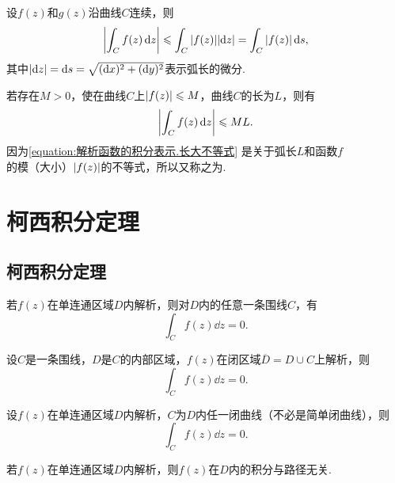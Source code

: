 \begin{theorem}
设\(f(z)\)和\(g(z)\)沿曲线\(C\)连续，则\[
\abs{\int_C f(z) \dd{z}}
\leqslant \int_C{\abs{f(z)}\abs{\dd{z}}}
= \int_C{\abs{f(z)}\dd{s}},
\]其中\(\abs{\dd{z}}=\dd{s}=\sqrt{(\dd{x})^2+(\dd{y})^2}\)表示弧长的微分.
\end{theorem}

\begin{corollary}[积分估值定理]\label{theorem:解析函数的积分表示.积分估值定理}
若存在\(M > 0\)，使在曲线\(C\)上\(\abs{f(z)} \leqslant M\)，曲线\(C\)的长为\(L\)，则有\begin{equation}\label{equation:解析函数的积分表示.长大不等式}
\abs{\int_C f(z) \dd{z}} \leqslant ML.
\end{equation}\rm
因为\cref{equation:解析函数的积分表示.长大不等式} 是关于弧长\(L\)和函数\(f\)的模（大小）\(\abs{f(z)}\)的不等式，所以又称之为.
\end{corollary}

\section{柯西积分定理}
\subsection{柯西积分定理}
\begin{theorem}[柯西积分定理]\label{theorem:解析函数的积分表示.柯西积分定理}
若\(f(z)\)在单连通区域\(D\)内解析，则对\(D\)内的任意一条围线\(C\)，有\[
\int_C f(z) \dd{z}=0.
\]
\end{theorem}

\begin{theorem}\label{theorem:解析函数的积分表示.柯西积分定理.闭区域的情形}
设\(C\)是一条围线，\(D\)是\(C\)的内部区域，\(f(z)\)在闭区域\(\overline{D}=D \cup C\)上解析，则\[
\int_C f(z) \dd{z}=0.
\]
\end{theorem}

\begin{corollary}\label{theorem:解析函数的积分表示.柯西积分定理.非简单闭曲线的情形}
设\(f(z)\)在单连通区域\(D\)内解析，\(C\)为\(D\)内任一闭曲线（不必是简单闭曲线），则\[
\int_C f(z) \dd{z} = 0.
\]
\end{corollary}

\begin{corollary}\label{theorem:解析函数的积分表示.解析函数在解析区域内的积分与路径无关}
若\(f(z)\)在单连通区域\(D\)内解析，则\(f(z)\)在\(D\)内的积分与路径无关.
\end{corollary}

